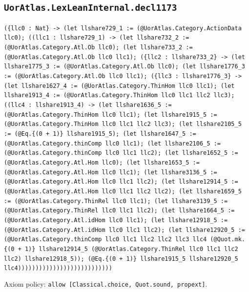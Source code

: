 \documentclass[11pt]{article}
\begin{document}
\subsection*{\texttt{UorAtlas.LexLeanInternal.decl1173}}
\noindent\texttt{(\{llc0 : Nat\} -> (let llshare729\_1 := (@UorAtlas.Category.ActionData llc0); ((llc1 : llshare729\_1) -> (let llshare732\_2 := (@UorAtlas.Category.Atl.Ob llc0); (let llshare733\_2 := (@UorAtlas.Category.Atl.Ob llc0 llc1); (\{llc2 : llshare733\_2\} -> (let llshare1775\_3 := (@UorAtlas.Category.Atl.Ob llc0); (let llshare1776\_3 := (@UorAtlas.Category.Atl.Ob llc0 llc1); (\{llc3 : llshare1776\_3\} -> (let llshare1627\_4 := (@UorAtlas.Category.ThinHom llc0 llc1); (let llshare1913\_4 := (@UorAtlas.Category.ThinHom llc0 llc1 llc2 llc3); ((llc4 : llshare1913\_4) -> (let llshare1636\_5 := (@UorAtlas.Category.ThinHom llc0 llc1); (let llshare1915\_5 := (@UorAtlas.Category.ThinHom llc0 llc1 llc2 llc3); (let llshare2105\_5 := (@Eq.\{(0 + 1)\} llshare1915\_5); (let llshare1647\_5 := (@UorAtlas.Category.thinComp llc0 llc1); (let llshare2106\_5 := (@UorAtlas.Category.thinComp llc0 llc1 llc2); (let llshare1652\_5 := (@UorAtlas.Category.Atl.Hom llc0); (let llshare1653\_5 := (@UorAtlas.Category.Atl.Hom llc0 llc1); (let llshare3136\_5 := (@UorAtlas.Category.Atl.Hom llc0 llc1 llc2); (let llshare12914\_5 := (@UorAtlas.Category.Atl.Hom llc0 llc1 llc2 llc2); (let llshare1659\_5 := (@UorAtlas.Category.ThinRel llc0 llc1); (let llshare3139\_5 := (@UorAtlas.Category.ThinRel llc0 llc1 llc2); (let llshare1664\_5 := (@UorAtlas.Category.Atl.idHom llc0 llc1); (let llshare12918\_5 := (@UorAtlas.Category.Atl.idHom llc0 llc1 llc2); (let llshare12920\_5 := (@UorAtlas.Category.thinComp llc0 llc1 llc2 llc2 llc3 llc4 (@Quot.mk.\{(0 + 1)\} llshare12914\_5 (@UorAtlas.Category.ThinRel llc0 llc1 llc2 llc2) llshare12918\_5)); (@Eq.\{(0 + 1)\} llshare1915\_5 llshare12920\_5 llc4)))))))))))))))))))))))))))}\par
\noindent Axiom policy: \texttt{allow [Classical.choice, Quot.sound, propext]}.\par
\end{document}
